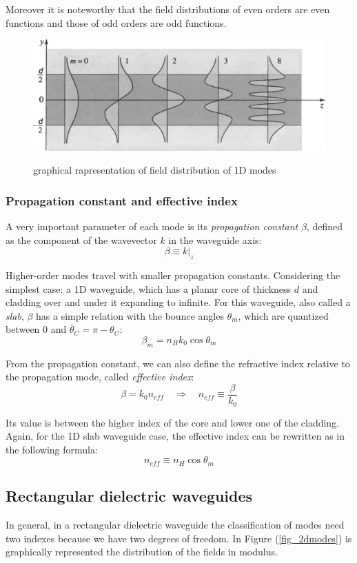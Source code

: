 \documentclass[12pt,a4paper,twoside]{article}
\begin{document}
Moreover it is noteworthy that the field distributions of even orders are even functions and those of odd orders are odd functions.

\begin{figure}[ht]
	\centering
	\includegraphics[width=.75\textwidth]{1D_fields.png}
	\label{fig_1dmodes}
	\caption{graphical rapresentation of field distribution of 1D modes}
\end{figure}

\subsubsection*{Propagation constant and effective index}

A very important parameter of each mode is its \textit{propagation constant} $\beta$, defined as the component of the wavevector $k$ in the waveguide axis:
\begin{equation}
\beta \equiv k|_z
\end{equation}

Higher-order modes travel with smaller propagation constants.
Considering the simplest case: a 1D waveguide, which has a planar core of thickness $d$ and cladding over and under it expanding to infinite.
For this waveguide, also called a \textit{slab}, $\beta$ has a simple relation with the bounce angles $\theta_m$, which are quantized between $0$ and $\bar{\theta}_C = \pi - \theta_C$:
$$\beta_m = n_H k_0 \cos \theta_m$$

From the propagation constant, we can also define the refractive index relative to the propagation mode, called \textit{effective index}:
\begin{equation}
\beta = k_0 n_{eff} \quad \Rightarrow \quad n_{eff} \equiv \frac{\beta}{k_0}
\end{equation}

Its value is between the higher index of the core and lower one of the cladding.
Again, for the 1D slab waveguide case, the effective index can be rewritten as in the following formula:
$$ n_{eff} \equiv n_H \cos \theta_m$$


\subsection{Rectangular dielectric waveguides}
In general, in a rectangular dielectric waveguide the classification of modes need two indexes because we have two degrees of freedom.
In Figure (\ref{fig_2dmodes}) is graphically represented the distribution of the fields in modulus.
\end{document}
